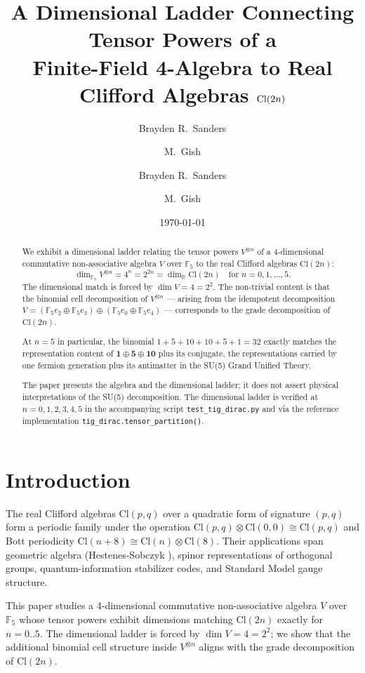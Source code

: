 \documentclass[11pt,reqno]{amsart}
\title[Dimensional Ladder $V^{\otimes n} \leftrightarrow \Cl(2n)$]
{A Dimensional Ladder Connecting Tensor Powers of a \\
 Finite-Field 4-Algebra to Real Clifford Algebras $\Cl(2n)$}
\author{Brayden R.\ Sanders \and M.\ Gish}
\author{Brayden R.\ Sanders \and M.\ Gish}
\date{\today}
\theoremstyle{plain}
\theoremstyle{definition}
\theoremstyle{remark}
\newcommand{\F}{\mathbb{F}}
\newcommand{\R}{\mathbb{R}}
\newcommand{\Cl}{\mathrm{Cl}}
\begin{document}
\begin{abstract}
We exhibit a dimensional ladder relating the tensor powers $V^{\otimes n}$
of a 4-dimensional commutative non-associative algebra $V$ over $\F_5$ to
the real Clifford algebras $\Cl(2n)$:
\[
\dim_{\F_5} V^{\otimes n} = 4^n = 2^{2n} = \dim_\R \Cl(2n)
\quad\text{for } n = 0, 1, \ldots, 5.
\]
The dimensional match is forced by $\dim V = 4 = 2^2$. The non-trivial
content is that the binomial cell decomposition of $V^{\otimes n}$ ---
arising from the idempotent decomposition $V = (\F_5 e_2 \oplus \F_5 e_3)
\oplus (\F_5 e_0 \oplus \F_5 e_4)$ --- corresponds to the grade
decomposition of $\Cl(2n)$.

At $n = 5$ in particular, the binomial $1 + 5 + 10 + 10 + 5 + 1 = 32$
exactly matches the representation content of $\mathbf{1} \oplus
\bar{\mathbf{5}} \oplus \mathbf{10}$ plus its conjugate, the
representations carried by one fermion generation plus its antimatter
in the SU(5) Grand Unified Theory.

The paper presents the algebra and the dimensional ladder; it does not
assert physical interpretations of the SU(5) decomposition. The
dimensional ladder is verified at $n = 0, 1, 2, 3, 4, 5$ in the
accompanying script \texttt{test\_tig\_dirac.py} and via the reference
implementation \texttt{tig\_dirac.tensor\_partition()}.
\end{abstract}

\maketitle

\tableofcontents

\section{Introduction}

The real Clifford algebras $\Cl(p, q)$ over a quadratic form of
signature $(p, q)$ form a periodic family under the operation
$\Cl(p, q) \otimes \Cl(0, 0) \cong \Cl(p, q)$ and Bott periodicity
$\Cl(n + 8) \cong \Cl(n) \otimes \Cl(8)$. Their applications span
geometric algebra (Hestenes-Sobczyk \cite{HesteneSobczyk1984}),
spinor representations of orthogonal groups,
quantum-information stabilizer codes, and Standard Model gauge
structure.

This paper studies a 4-dimensional commutative non-associative algebra
$V$ over $\F_5$ whose tensor powers exhibit dimensions matching
$\Cl(2n)$ exactly for $n = 0..5$. The dimensional ladder is forced by
$\dim V = 4 = 2^2$; we show that the additional binomial cell
structure inside $V^{\otimes n}$ aligns with the grade decomposition
of $\Cl(2n)$.
\end{document}
